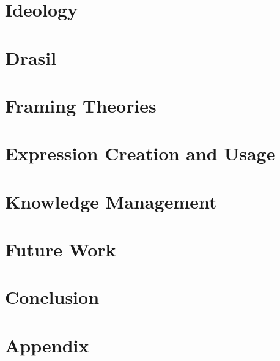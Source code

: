 \documentclass[12pt,oneside]{book}
\begin{document}
\chapter{Ideology}
\label{chap:ideology}


\chapter{Drasil}
\label{chap:drasil}


\chapter{Framing Theories}
\label{chap:modelkinds}


\chapter{Expression Creation and Usage}
\label{chap:typedExpr}


\chapter{Knowledge Management}
\label{chap:knowledgeMgmt}


\chapter{Future Work}
\label{chap:futureWork}


\chapter{Conclusion}
\label{chap:conclusion}


\printbibliography[heading=bibintoc]


\backmatter

\appendix
\chapter{Appendix}

\end{document}
